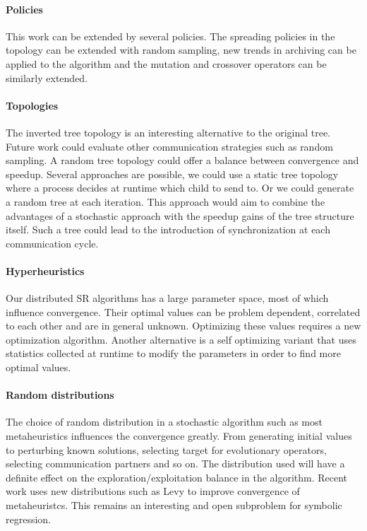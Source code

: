 \paragraph{Policies}
This work can be extended by several policies. The spreading policies in the topology can be extended with random sampling, new trends in archiving can be applied to the algorithm and the mutation and crossover operators can be similarly extended. 

\paragraph{Topologies}
The inverted tree topology is an interesting alternative to the original tree. Future work could evaluate other communication strategies such as random sampling. A random tree topology could offer a balance between convergence and speedup. Several approaches are possible, we could use a static tree topology where a process decides at runtime which child to send to. Or we could generate a random tree at each iteration. This approach would aim to combine the advantages of a stochastic approach with the speedup gains of the tree structure itself. Such a tree could lead to the introduction of synchronization at each communication cycle.

\paragraph{Hyperheuristics}
Our distributed SR algorithms has a large parameter space, most of which influence convergence. Their optimal values can be problem dependent, correlated to each other and are in general unknown. Optimizing these values requires a new optimization algorithm. Another alternative is a self optimizing variant that uses statistics collected at runtime to modify the parameters in order to find more optimal values.

\paragraph{Random distributions}
The choice of random distribution in a stochastic algorithm such as most metaheuristics influences the convergence greatly. From generating initial values to perturbing known solutions, selecting target for evolutionary operators, selecting communication partners and so on. The distribution used will have a definite effect on the exploration/exploitation balance in the algorithm. Recent work uses new distributions such as Levy \citep{ABCLevy} to improve convergence of metaheuristcs. This remains an interesting and open subproblem for symbolic regression. 

